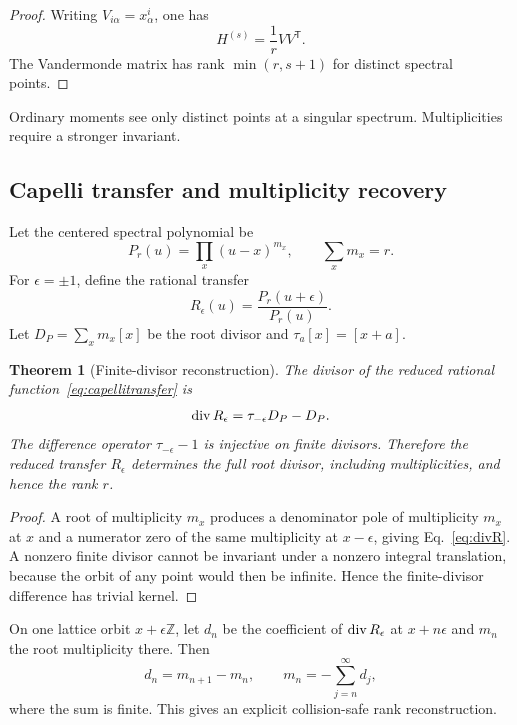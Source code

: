 \documentclass[aps,prd,preprint,nofootinbib,superscriptaddress]{revtex4-2}
\newtheorem{theorem}{Theorem}[section]
\theoremstyle{definition}
\theoremstyle{remark}
\begin{document}
\begin{proof}
Writing $V_{i\alpha}=x_\alpha^i$, one has
\[
H^{(s)}=\frac1rVV^{\mathsf T}.
\]
The Vandermonde matrix has rank $\min(r,s+1)$ for distinct spectral points.
\end{proof}

Ordinary moments see only distinct points at a singular spectrum.  Multiplicities require a stronger invariant.

\subsection{Capelli transfer and multiplicity recovery}

Let the centered spectral polynomial be
\begin{equation}
P_r(u)
=
\prod_x(u-x)^{m_x},
\qquad
\sum_xm_x=r.
\label{eq:spectralpoly}
\end{equation}
For $\epsilon=\pm1$, define the rational transfer
\begin{equation}
R_\epsilon(u)
=
\frac{P_r(u+\epsilon)}{P_r(u)}.
\label{eq:capellitransfer}
\end{equation}
Let $D_P=\sum_xm_x[x]$ be the root divisor and $\tau_a[x]=[x+a]$.

\begin{theorem}[Finite-divisor reconstruction]
\label{thm:divisorreconstruction}
The divisor of the reduced rational function~\eqref{eq:capellitransfer} is
\begin{equation}
{\rm div}\,R_\epsilon
=
\tau_{-\epsilon}D_P-D_P.
\label{eq:divR}
\end{equation}
The difference operator $\tau_{-\epsilon}-1$ is injective on finite divisors.  Therefore the reduced transfer $R_\epsilon$ determines the full root divisor, including multiplicities, and hence the rank $r$.
\end{theorem}

\begin{proof}
A root of multiplicity $m_x$ produces a denominator pole of multiplicity $m_x$ at $x$ and a numerator zero of the same multiplicity at $x-\epsilon$, giving Eq.~\eqref{eq:divR}.  A nonzero finite divisor cannot be invariant under a nonzero integral translation, because the orbit of any point would then be infinite.  Hence the finite-divisor difference has trivial kernel.
\end{proof}

On one lattice orbit $x+\epsilon\mathbb Z$, let $d_n$ be the coefficient of ${\rm div}\,R_\epsilon$ at $x+n\epsilon$ and $m_n$ the root multiplicity there.  Then
\begin{equation}
d_n=m_{n+1}-m_n,
\qquad
m_n=-\sum_{j=n}^{\infty}d_j,
\label{eq:multiplicityreconstruction}
\end{equation}
where the sum is finite.  This gives an explicit collision-safe rank reconstruction.
\end{document}
